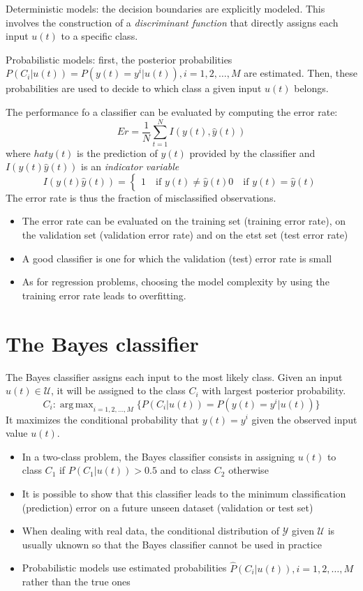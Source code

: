 \documentclass{book}
\DeclareMathOperator*{\argmax}{arg\,max}
\begin{document}
Deterministic models: the decision boundaries are explicitly modeled. This involves the construction of a \emph{discriminant function} that directly assigns each input $u(t)$ to a specific class. 

Probabilistic models: first, the posterior probabilities $P(C_i|u(t)) = P(y(t)=y^i|u(t)), i= 1,2,\dots,M$ are estimated. Then, these probabilities are used to decide to which class a given input $u(t)$ belongs. 

The performance fo a classifier can be evaluated by computing the error rate: 
\[
    Er = \displaystyle\frac{1}{N}\displaystyle\sum_{t=1}^{N}I(y(t),\hat{y}(t))
\]
where $hat{y}(t)$ is the prediction of $y(t)$ provided by the classifier and $I(y(t)\hat{y}(t))$ is an \emph{indicator variable} 
\[
    I(y(t)\hat{y}(t)) = \begin{cases}
        1 \quad \text{if } y(t)\neq \hat{y}(t)
        0 \quad \text{if } y(t) = \hat{y}(t)
    \end{cases}
\]
The error rate is thus the fraction of misclassified observations. 
\begin{itemize}
    \item The error rate can be evaluated on the training set (training error rate), on the validation set (validation error rate) and on the etst set (test error rate)
        \item A good classifier is one for which the validation (test) error rate is small 
            \item As for regression problems, choosing the model complexity by using the training error rate leads to overfitting. 
\end{itemize}

\section{The Bayes classifier}
The Bayes classifier assigns each input to the most likely class. Given an input $u(t)\in \mathcal{U}$, it will be assigned to the class $C_i$ with largest posterior probability. 
\[
    C_i : \argmax_{i=1,2,\dots,M}\{P(C_i|u(t))=P(y(t)=y^i|u(t)) \}
\]
It maximizes the conditional probability that $y(t)=y^i$ given the observed input value $u(t)$. 
\begin{itemize}
    \item In a two-class problem, the Bayes classifier consists in assigning $u(t)$ to class $C_1$ if $P(C_1|u(t))>0.5$ and to class $C_2$ otherwise 
    \item It is possible to show that this classifier leads to the minimum classification (prediction) error on a future unseen dataset (validation or test set)
    \item When dealing with real data, the conditional distribution of $\mathcal{Y}$ given $\mathcal{U}$ is usually uknown so that the Bayes classifier cannot be used in practice 
    \item Probabilistic models use estimated probabilities $\hat{P}(C_i|u(t)),i=1,2,\dots,M$ rather than the true ones
\end{itemize}
\end{document}
